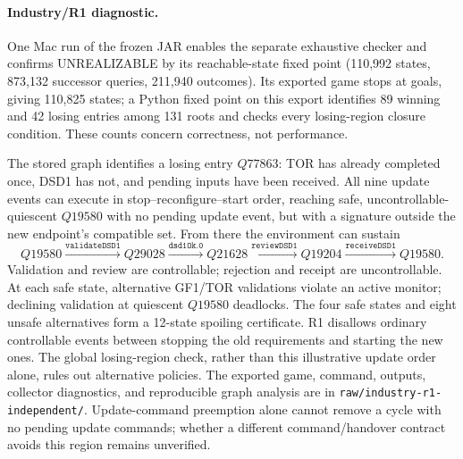 \documentclass[11pt]{article}
\begin{document}
\paragraph{Industry/R1 diagnostic.}
One Mac run of the frozen JAR enables the separate exhaustive checker and confirms UNREALIZABLE by its reachable-state fixed point (110,992 states, 873,132 successor queries, 211,940 outcomes). Its exported game stops at goals, giving 110,825 states; a Python fixed point on this export identifies 89 winning and 42 losing entries among 131 roots and checks every losing-region closure condition. These counts concern correctness, not performance.

The stored graph identifies a losing entry $Q77863$: TOR has already completed once, DSD1 has not, and pending inputs have been received. All nine update events can execute in stop--reconfigure--start order, reaching safe, uncontrollable-quiescent $Q19580$ with no pending update event, but with a signature outside the new endpoint's compatible set. From there the environment can sustain
\[
Q19580\xrightarrow{\texttt{validateDSD1}}Q29028
\xrightarrow{\texttt{dsd1Ok.0}}Q21628
\xrightarrow{\texttt{reviewDSD1}}Q19204
\xrightarrow{\texttt{receiveDSD1}}Q19580.
\]
Validation and review are controllable; rejection and receipt are uncontrollable. At each safe state, alternative GF1/TOR validations violate an active monitor; declining validation at quiescent $Q19580$ deadlocks. The four safe states and eight unsafe alternatives form a 12-state spoiling certificate. R1 disallows ordinary controllable events between stopping the old requirements and starting the new ones. The global losing-region check, rather than this illustrative update order alone, rules out alternative policies. The exported game, command, outputs, collector diagnostics, and reproducible graph analysis are in \texttt{raw/industry-r1-independent/}. Update-command preemption alone cannot remove a cycle with no pending update commands; whether a different command/handover contract avoids this region remains unverified.
\end{document}
